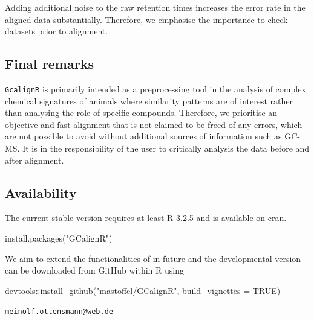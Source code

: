 Adding additional noise to the raw retention times increases the error
rate in the aligned data substantially. Therefore, we emphasise the
importance to check datasets prior to alignment.

\subsection{Final remarks}\label{final-remarks}

\texttt{GcalignR} is primarily intended as a preprocessing tool in the
analysis of complex chemical signatures of animals where similarity
patterns are of interest rather than analysing the role of specific
compounds. Therefore, we prioritise an objective and fast alignment that
is not claimed to be freed of any errors, which are not possible to
avoid without additional sources of information such as GC-MS. It is in
the responsibility of the user to critically analysis the data before
and after alignment.

\subsection{Availability}\label{availability}

The current stable version requires at least R 3.2.5 and is available on
cran.

\begin{Schunk}
\begin{Sinput}
install.packages("GCalignR")
\end{Sinput}
\end{Schunk}

We aim to extend the functionalities of  in future and the
developmental version can be downloaded from GitHub within R using
\href{https://cran.r-project.org/web/packages/devtools/index.html}{}
\citep{Oksanen.2016}

\begin{Schunk}
\begin{Sinput}
devtools::install_github("mastoffel/GCalignR", build_vignettes = TRUE)
\end{Sinput}
\end{Schunk}

\address{%
Meinolf Ottensmann\\
Department of Animal Behaviour\\
Bielefeld University\\ Morgenbreede 45\\ 33615 Bielefeld\\
}
\href{mailto:meinolf.ottensmann@web.de}{\nolinkurl{meinolf.ottensmann@web.de}}

